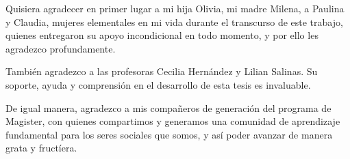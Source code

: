 Quisiera agradecer en primer lugar a mi hija Olivia, mi madre Milena, a Paulina y Claudia, mujeres elementales en mi vida durante el transcurso de este trabajo, quienes entregaron su apoyo incondicional en todo momento, y por ello les agradezco profundamente.

También agradezco a las profesoras Cecilia Hernández y Lilian Salinas. Su soporte, ayuda y comprensión en el desarrollo de esta tesis es invaluable.

De igual manera, agradezco a mis compañeros de generación del programa de Magister, con quienes compartimos y generamos una comunidad de aprendizaje fundamental para los seres sociales que somos, y así poder avanzar de manera grata y fructíera.

